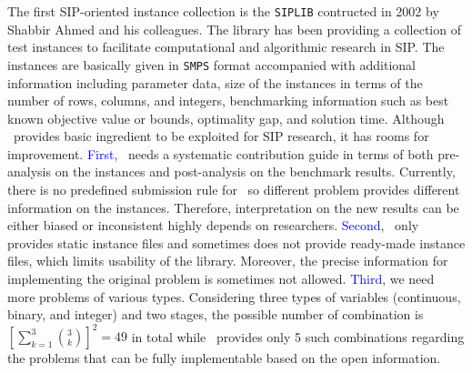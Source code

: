 The first SIP-oriented instance collection is the \texttt{SIPLIB} \cite{web:SIPLIB1} contructed in 2002 by Shabbir Ahmed and his colleagues. The library has been providing a collection of test instances to facilitate computational and algorithmic research in SIP. The instances are basically given in \texttt{SMPS} format accompanied with additional information including parameter data, size of the instances in terms of the number of rows, columns, and integers, benchmarking information such as best known objective value or bounds, optimality gap, and solution time. Although \siplib\ provides basic ingredient to be exploited for SIP research, it has rooms for improvement. \textcolor{blue}{First}, \siplib\ needs a systematic contribution guide in terms of both pre-analysis on the instances and post-analysis on the benchmark results. Currently, there is no predefined submission rule for \siplib\ so different problem provides different information on the instances. Therefore, interpretation on the new results can be either biased or inconsistent highly depends on researchers. \textcolor{blue}{Second}, \siplib\ only provides static instance files and sometimes does not provide ready-made instance files, which limits usability of the library. Moreover, the precise information for implementing the original problem is sometimes not allowed. \textcolor{blue}{Third}, we need more problems of various types. Considering three types of variables (continuous, binary, and integer) and two stages, the possible number of combination is $\left[\sum_{k=1}^3\binom{3}{k}\right]^2=49$ in total while \siplib\ provides only 5 such combinations regarding the problems that can be fully implementable based on the open information.







